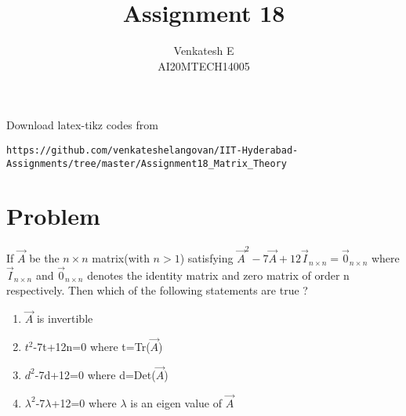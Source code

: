 \documentclass[journal,12pt]{IEEEtran}
\begin{document}
     \def\rightbox#1{\makebox[0in][r]{#1}}
     \def\centbox#1{\makebox[0in]{#1}}
     \def\topbox#1{\raisebox{-\baselineskip}[0in][0in]{#1}}
     \def\midbox#1{\raisebox{-0.5\baselineskip}[0in][0in]{#1}}
\vspace{3cm}
\title{Assignment 18}
\author{Venkatesh E\\AI20MTECH14005}
\maketitle
\bigskip
\renewcommand{\thefigure}{\theenumi}
\renewcommand{\thetable}{\theenumi}
Download latex-tikz codes from
\begin{lstlisting}
https://github.com/venkateshelangovan/IIT-Hyderabad-Assignments/tree/master/Assignment18_Matrix_Theory
\end{lstlisting}
\section{\textbf{Problem}}
If $\vec{A}$ be the $n \times n$ matrix(with $n>1$) satisfying $\vec{A}^2-7\vec{A}+12\vec{I}_{n\times n}=\vec{0}_{n\times n}$ where $\vec{I}_{n\times n}$ and $\vec{0}_{n\times n}$ denotes the identity matrix and zero matrix of order n respectively. Then which of the following statements are true ? 
\begin{enumerate}
\item $\vec{A}$ is invertible  
\item $t^2$-7t+12n=0 where t=Tr($\vec{A}$)
\item $d^2$-7d+12=0 where d=Det($\vec{A}$)
\item  $\lambda^2$-7$\lambda$+12=0 where $\lambda$ is an eigen value of $\vec{A}$
\end{enumerate}
\end{document}
